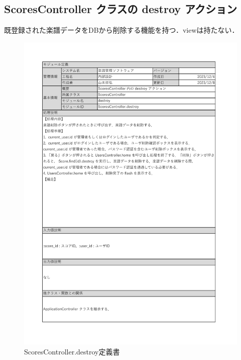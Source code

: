 \subsection*{ScoresController クラスの destroy アクション}
既登録された楽譜データをDBから削除する機能を持つ．viewは持たない．
\begin{figure}[H]
    \centering
    \includegraphics[scale=0.6]{img/Scores/xlsx/ScoresController_destroy.pdf}
    \vspace{-1cm}
    \caption{ScoresController.destroy定義書}
\end{figure}
